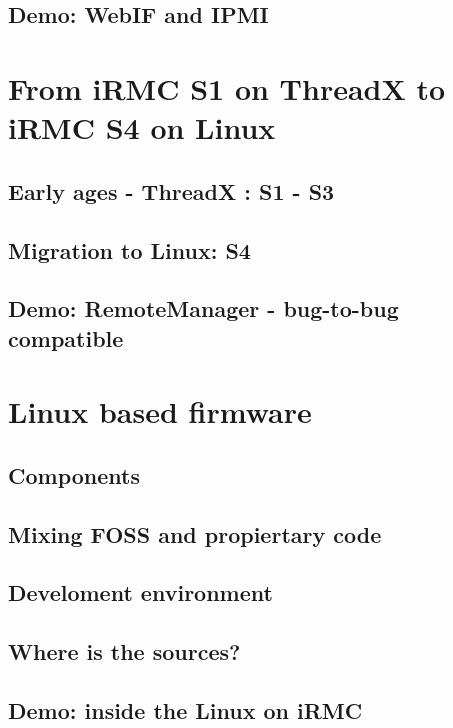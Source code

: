 \documentclass{beamer}
\begin{document}
  \subsection{Demo: WebIF and IPMI}

\section{From iRMC S1 on ThreadX to iRMC S4 on Linux}
  \subsection{Early ages - ThreadX : S1 - S3}
  \subsection{Migration to Linux: S4}
  \subsection{Demo: RemoteManager - bug-to-bug compatible}

\section{Linux based firmware}
  \subsection{Components}
  \subsection{Mixing FOSS and propiertary code}
  \subsection{Develoment environment}
  \subsection{Where is the sources?}
  \subsection{Demo: inside the Linux on iRMC}


%
%
%
%
\end{document}
